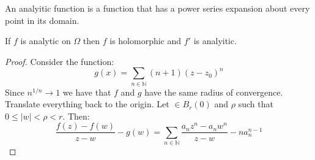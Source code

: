 \documentclass[crop=false,class=article]{standalone}                           %
\begin{document}
        An analyitic function is a function that has a power series expansion
        about every point in its domain.
        \begin{theorem}
            If $f$ is analytic on $\Omega$ then $f$ is holomorphic and $f'$ is
            analyitic.
        \end{theorem}
        \begin{proof}
            Consider the function:
            \begin{equation}
                g(x)=\sum_{n\in\mathbb{N}}(n+1)(z-z_{0})^{n}
            \end{equation}
            Since $n^{1/n}\rightarrow{1}$ we have that $f$ and $g$ have the
            same radius of convergence. Translate everything back to the origin.
            Let $\in{B}_{r}(0)$ and $\rho$ such that $0\leq|w|<\rho<r$. Then:
            \begin{equation}
                \frac{f(z)-f(w)}{z-w}-g(w)
                =\sum_{n\in\mathbb{N}}\frac{a_{n}z^{n}-a_{n}w^{n}}{z-w}-
                    na_{n}^{n-1}
            \end{equation}
        \end{proof}
\end{document}

